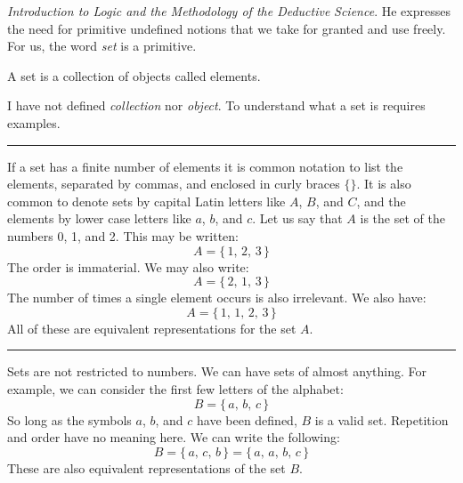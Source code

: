         \textit{Introduction to Logic and the Methodology of the Deductive}
        \textit{Science}. He expresses the need for primitive
        undefined notions that we take for granted and use freely. For us, the
        word \textit{set} is a primitive.
        \begin{definition}
            A \gls{set} is a collection of objects called elements.
        \end{definition}
        I have not defined \textit{collection} nor \textit{object}. To
        understand what a set is requires examples.
        \par\hfill\par\hrule
        \begin{example}
            If a set has a finite number of
            elements it is common notation to list the elements, separated by
            commas, and enclosed in curly braces $\{\}$. It is also common to
            denote sets by capital Latin letters like $A$, $B$, and $C$, and
            the elements by lower case letters like $a$, $b$, and $c$. Let us
            say that $A$ is the set of the numbers 0, 1, and 2.
            This may be written:
            \begin{equation}
                A=\{\,1,\,2,\,3\,\}
            \end{equation}
            The order is immaterial. We may also write:
            \begin{equation}
                A=\{\,2,\,1,\,3\,\}
            \end{equation}
            The number of times a single element occurs is also irrelevant. We
            also have:
            \begin{equation}
                A=\{\,1,\,1,\,2,\,3\,\}
            \end{equation}
            All of these are equivalent representations for the set $A$.
        \end{example}
        \hrule
        \begin{example}
            Sets are not restricted to numbers. We can have sets of almost
            anything. For example, we can consider the first few letters of
            the alphabet:
            \begin{equation}
                B=\{\,a,\,b,\,c\,\}
            \end{equation}
            So long as the symbols $a$, $b$, and $c$ have been defined, $B$ is
            a valid set. Repetition and order have no meaning here. We can write
            the following:
            \begin{equation}
                B=\{\,a,\,c,\,b\,\}=\{\,a,\,a,\,b,\,c\,\}
            \end{equation}
            These are also equivalent representations of the set $B$.
        \end{example}
